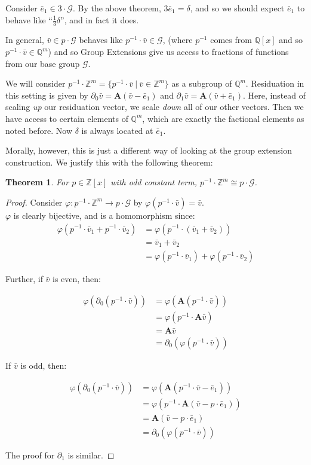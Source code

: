 \documentclass{article}
\newcommand{\G}{\mathcal{G}}
\newcommand{\Z}{\mathbb{Z}}
\newcommand{\Q}{\mathbb{Q}}
\newcommand{\2}{\textbf{2}}
\newcommand{\Am}{\textbf{A}}
\newcommand{\del}{\partial}
\newcommand{\vv}{\bar{v}}
\newcommand{\e}{\bar{e}}
\newtheorem{thm}{Theorem}
\theoremstyle{definition}
\begin{document}
Consider $\e_1 \in 3 \cdot \G$. By the above theorem, $3\e_1 = \delta$,
and so we should expect $\e_1$ to behave like ``$\frac{1}{3}\delta$'', 
and in fact it does.

In general, $\vv \in p \cdot \G$ behaves like $p^{-1} \cdot \vv \in \G$,
(where $p^{-1}$ comes from $\Q[x]$ and so $p^{-1} \cdot \vv \in \Q^m$)
and so Group Extensions give us access to fractions of functions from 
our base group $\G$.

We will consider $p^{-1} \cdot \Z^m = \{ p^{-1} \cdot \vv~|~\vv \in \Z^m \}$
as a subgroup of $\Q^m$. Residuation in this setting is given by
$\del_0 \vv = \Am (\vv - \e_1)$ and $\del_1 \vv = \Am (\vv + \e_1)$.
Here, instead of scaling \emph{up} our residuation vector, 
we scale \emph{down} all of our other vectors. Then we have access to 
certain elements of $\Q^m$, which are exactly the factional elements
as noted before. Now $\delta$ is always located at $\e_1$.

Morally, however, this is just a different way of looking at the group 
extension construction. We justify this with the following theorem:

\begin{thm}
  For $p \in \Z[x]$ with odd constant term, 
  $p^{-1} \cdot \Z^m \cong p \cdot \G$.
\end{thm}

\begin{proof}
  Consider $\varphi : p^{-1} \cdot \Z^m \to p \cdot \G$ by
  $\varphi(p^{-1} \cdot \vv) = \vv$.\\
  $\varphi$ is clearly bijective, and is a homomorphism since:
  \begin{align*}
       \varphi(p^{-1} \cdot \vv_1 + p^{-1} \cdot \vv_2) 
    &= \varphi(p^{-1} \cdot (\vv_1 + \vv_2))\\
    &= \vv_1 + \vv_2\\
    &= \varphi(p^{-1} \cdot \vv_1) + \varphi(p^{-1} \cdot \vv_2) 
  \end{align*}

  Further, if $\vv$ is even, then:

  \begin{align*}
       \varphi(\del_0 (p^{-1} \cdot \vv))
    &= \varphi(\Am (p^{-1} \cdot \vv))\\
    &= \varphi(p^{-1} \cdot \Am \vv)\\
    &= \Am \vv\\
    &= \del_0 (\varphi(p^{-1} \cdot \vv))
  \end{align*}

  If $\vv$ is odd, then: 

  \begin{align*}
       \varphi(\del_0 (p^{-1} \cdot \vv))
    &= \varphi(\Am (p^{-1} \cdot \vv - \e_1))\\
    &= \varphi(p^{-1} \cdot \Am (\vv - p \cdot \e_1))\\
    &= \Am (\vv - p \cdot \e_1)\\
    &= \del_0 (\varphi(p^{-1} \cdot \vv))
  \end{align*}

  The proof for $\del_1$ is similar.
\end{proof}
\end{document}
